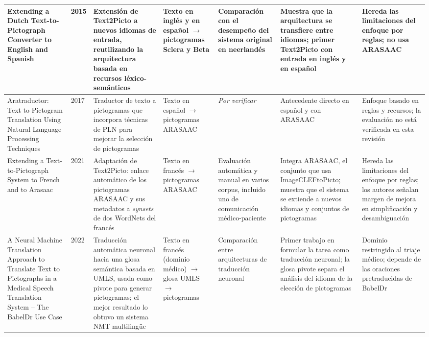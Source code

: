 \begin{landscape}
\begin{longtable}{L{3cm} L{1.3cm} L{3.4cm} L{2.6cm} L{2.4cm} L{3.7cm} L{3.7cm}}
Extending a Dutch Text-to-Pictograph Converter to English and Spanish \cite{sevens2015} & 2015 &
Extensión de Text2Picto a nuevos idiomas de entrada, reutilizando la arquitectura basada en recursos léxico-semánticos &
Texto en inglés y en español $\rightarrow$ pictogramas Sclera y Beta &
Comparación con el desempeño del sistema original en neerlandés &
Muestra que la arquitectura se transfiere entre idiomas; primer Text2Picto con entrada en inglés y en español &
Hereda las limitaciones del enfoque por reglas; no usa ARASAAC \\
\midrule

Aratraductor: Text to Pictogram Translation Using Natural Language Processing Techniques \cite{bautista2017} & 2017 &
Traductor de texto a pictogramas que incorpora técnicas de PLN para mejorar la selección de pictogramas &
Texto en español $\rightarrow$ pictogramas ARASAAC &
\textit{Por verificar} &
Antecedente directo en español y con ARASAAC &
Enfoque basado en reglas y recursos; la evaluación no está verificada en esta revisión \\
\midrule

Extending a Text-to-Pictograph System to French and to Arasaac \cite{norre2021} & 2021 &
Adaptación de Text2Picto: enlace automático de los pictogramas ARASAAC y sus metadatos a \textit{synsets} de dos WordNets del francés &
Texto en francés $\rightarrow$ pictogramas ARASAAC &
Evaluación automática y manual en varios corpus, incluido uno de comunicación médico-paciente &
Integra ARASAAC, el conjunto que usa ImageCLEFtoPicto; muestra que el sistema se extiende a nuevos idiomas y conjuntos de pictogramas &
Hereda las limitaciones del enfoque por reglas; los autores señalan margen de mejora en simplificación y desambiguación \\
\midrule

A Neural Machine Translation Approach to Translate Text to Pictographs in a Medical Speech Translation System -- The BabelDr Use Case \cite{mutal2022} & 2022 &
Traducción automática neuronal hacia una glosa semántica basada en UMLS, usada como pivote para generar pictogramas; el mejor resultado lo obtuvo un sistema NMT multilingüe &
Texto en francés (dominio médico) $\rightarrow$ glosa UMLS $\rightarrow$ pictogramas &
Comparación entre arquitecturas de traducción neuronal &
Primer trabajo en formular la tarea como traducción neuronal; la glosa pivote separa el análisis del idioma de la elección de pictogramas &
Dominio restringido al triaje médico; depende de las oraciones pretraducidas de BabelDr \\
\midrule


\end{longtable}
\end{landscape}
